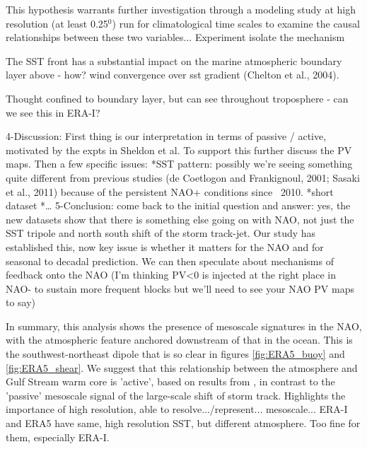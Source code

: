 This hypothesis warrants further investigation through a modeling study at high resolution (at least 0.25$^{0}$) run for climatological time scales to examine the causal relationships between these two variables... Experiment isolate the mechanism



The SST front has a substantial impact on the marine atmospheric boundary layer above - how? wind convergence over sst gradient (Chelton et al., 2004).

Thought confined to boundary layer, but can see throughout troposphere - can we see this in ERA-I?

4-Discussion: First thing is our interpretation in terms of passive / active, motivated by the expts in Sheldon et al. To support this further discuss the PV maps. Then a few specific issues:
*SST pattern: possibly we’re seeing something quite different from previous studies (de Coetlogon and Frankignoul, 2001; Sasaki et al., 2011) because of the persistent NAO+ conditions since ~2010.
*short dataset
*…
5-Conclusion: come back to the initial question and answer: yes, the new datasets show that there is something else going on with NAO, not just the SST tripole and north south shift of the storm track-jet. Our study has established this, now key issue is whether it matters for the NAO and for seasonal to decadal prediction. We can then speculate about mechanisms of feedback onto the NAO (I’m thinking PV<0 is injected at the right place in NAO- to sustain more frequent blocks but we’ll need to see your NAO PV maps to say)

In summary, this analysis shows the presence of mesoscale signatures in the NAO, with the atmospheric feature anchored downstream of that in the ocean. This is the southwest-northeast dipole that is so clear in figures \ref{fig:ERA5_buoy} and \ref{fig:ERA5_shear}. We suggest that this relationship between the atmosphere and  Gulf Stream warm core is 'active', based on results from \citet{sheldon2017warm}, in contrast to the 'passive' mesoscale signal of the large-scale shift of storm track. Highlights the importance of high resolution, able to resolve.../represent... mesoscale... ERA-I and ERA5 have same, high resolution SST, but different atmosphere. Too fine for them, especially ERA-I.

